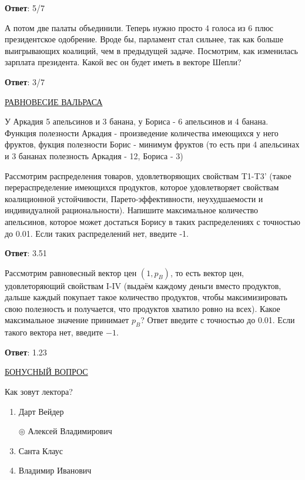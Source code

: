 \textbf{Ответ}: 
5/7 %

\task
А потом две палаты объединили. Теперь нужно просто 4 голоса из 6 плюс президентское одобрение. Вроде бы, парламент стал сильнее, так как больше выигрывающих коалиций, чем в предыдущей задаче. Посмотрим, как изменилась зарплата президента. Какой вес он будет иметь в векторе Шепли?

\textbf{Ответ}: 
3/7  %

\task
\underline{РАВНОВЕСИЕ ВАЛЬРАСА}

У Аркадия 5 апельсинов и 3 банана, у Бориса - 6 апельсинов и 4 банана. Функция полезности Аркадия - произведение количества имеющихся у него фруктов, фукция полезности Борис - минимум фруктов (то есть при 4 апельсинах и 3 бананах полезность Аркадия - 12, Бориса - 3)

Рассмотрим распределения товаров, удовлетворяющих свойствам T1-T3' (такое перераспределение имеющихся продуктов, которое удовлетворяет свойствам коалиционной устойчивости, Парето-эффективности, неухудшаемости и индивидуалной рациональности). Напишите максимальное количество апельсинов, которое может достаться Борису в таких распределениях с точностью до 0.01. Если таких распределений нет, введите -1.

\textbf{Ответ}: 
3.51

\task
Рассмотрим равновесный вектор цен $(1,p_B)$, то есть вектор цен, удовлеторяющий свойствам I-IV (выдаём каждому деньги вместо продуктов, дальше каждый покупает такое количество продуктов, чтобы максимизировать свою полезность и получается, что продуктов хватило ровно на всех). Какое максимальное значение принимает $p_B$? Ответ введите с точностью до 0.01. Если такого вектора нет, введите $-1$.

\textbf{Ответ}: 
1.23

\task
\underline{БОНУСНЫЙ ВОПРОС}

Как зовут лектора?

\begin{enumerate}[label=$\circ$]
	\item Дарт Вейдер
	\item[$\circledcirc$] Алексей Владимирович
	\item Санта Клаус
	\item Владимир Иванович
\end{enumerate}